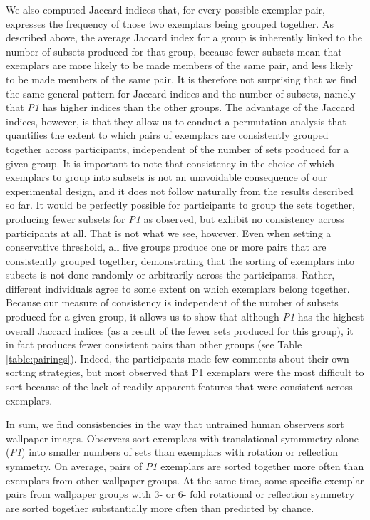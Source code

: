 \documentclass[symmetry,article,accept,pdftex,moreauthors]{Definitions/mdpi}
\begin{document}
We also computed Jaccard indices that, for every possible exemplar pair, expresses the frequency of those two exemplars being grouped together. As described above, the average Jaccard index for a group is inherently linked to the number of subsets produced for that group, because fewer subsets mean that exemplars are more likely to be made members of the same pair, and less likely to be made members of the same pair. It is therefore not surprising that we find the same general pattern for Jaccard indices and the number of subsets, namely that \textit{P1} has higher indices than the other groups. The advantage of the Jaccard indices, however, is that they allow us to conduct a permutation analysis that quantifies the extent to which pairs of exemplars are consistently grouped together across participants, independent of the number of sets produced for a given group. It is important to note that consistency in the choice of which exemplars to group into subsets is not an unavoidable consequence of our experimental design, and it does not follow naturally from the results described so far. It would be perfectly possible for participants to group the sets together, producing fewer subsets for \textit{P1} as observed, but exhibit no consistency across participants at all. That is not what we see, however. Even when setting a conservative threshold, all five groups produce one or more pairs that are consistently grouped together, demonstrating that the sorting of exemplars into subsets is not done randomly or arbitrarily across the participants. Rather, different individuals agree to some extent on which exemplars belong together. Because our measure of consistency is independent of the number of subsets produced for a given group, it allows us to show that although \textit{P1} has the highest overall Jaccard indices (as a result of the fewer sets produced for this group), it in fact produces fewer consistent pairs than other groups (see Table \ref{table:pairings}). Indeed, the participants made few comments about their own sorting strategies, but most observed that P1 exemplars were the most difficult to sort because of the lack of readily apparent features that were consistent across exemplars.

In sum, we find consistencies in the way that untrained human observers sort wallpaper images. Observers sort exemplars with translational symmmetry alone (\textit{P1}) into smaller numbers of sets than exemplars with rotation or reflection symmetry. On average, pairs of \textit{P1} exemplars are sorted together more often than exemplars from other wallpaper groups. At the same time, some specific exemplar pairs from wallpaper groups with 3- or 6- fold rotational or reflection symmetry are sorted together substantially more often than predicted by chance.
\end{document}
